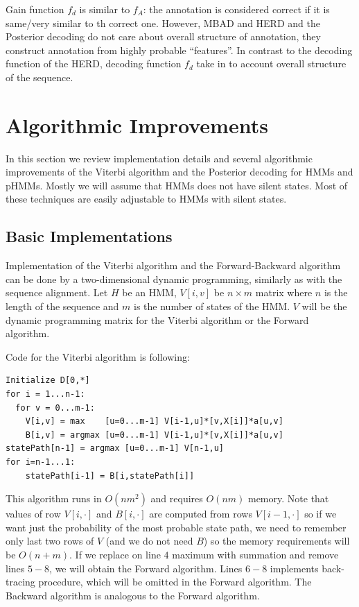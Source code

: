 Gain function $f_d$ is similar to $f_A$: the annotation is considered correct if
it is same/very similar to th correct one. However, MBAD and HERD and the
Posterior decoding do not care about overall structure of annotation, they
construct annotation from highly probable ``features''. In contrast to the
decoding function of the HERD, decoding function $f_d$ take in to account
overall structure of the sequence.


\section{Algorithmic Improvements}
\label{SECTION:ALGORITHMICIMPROVEMENTS}

In this section we review implementation details and several algorithmic
improvements of the Viterbi algorithm and the Posterior decoding for HMMs and
pHMMs. Mostly we will assume that HMMs does not have silent states.  Most of these
techniques are easily adjustable to HMMs with silent states. 

\subsection{Basic Implementations}

Implementation of the Viterbi algorithm and the Forward-Backward algorithm can be
done by a two-dimensional dynamic programming, similarly as with the sequence
alignment. Let $H$ be an HMM, $V[i,v]$ be  $n\times m$ matrix where $n$ is the
length of the sequence and $m$ is the number of states of the HMM. $V$ will be the
dynamic programming matrix for the Viterbi algorithm or the Forward algorithm.

Code for the Viterbi algorithm is following:
\begin{lstlisting}
Initialize D[0,*]
for i = 1...n-1:
  for v = 0...m-1:
    V[i,v] = max    [u=0...m-1] V[i-1,u]*[v,X[i]]*a[u,v]
    B[i,v] = argmax [u=0...m-1] V[i-1,u]*[v,X[i]]*a[u,v]
statePath[n-1] = argmax [u=0...m-1] V[n-1,u]
for i=n-1...1:
    statePath[i-1] = B[i,statePath[i]]
\end{lstlisting}

This algorithm runs in $O(nm^2)$ and requires $O(nm)$ memory. Note that values
of row $V[i,\cdot]$ and $B[i,\cdot]$ are computed from rows $V[i-1,\cdot]$ so if
we want just the probability of the most probable state path, we need to
remember only last two rows of $V$ (and we do not need $B$) so the memory
requirements will be $O(n+m)$. If we replace on line $4$ maximum with summation
and remove lines $5-8$, we will obtain the Forward algorithm. Lines $6-8$
implements back-tracing procedure, which will be omitted in the Forward
algorithm. The Backward algorithm is analogous to the Forward algorithm.

